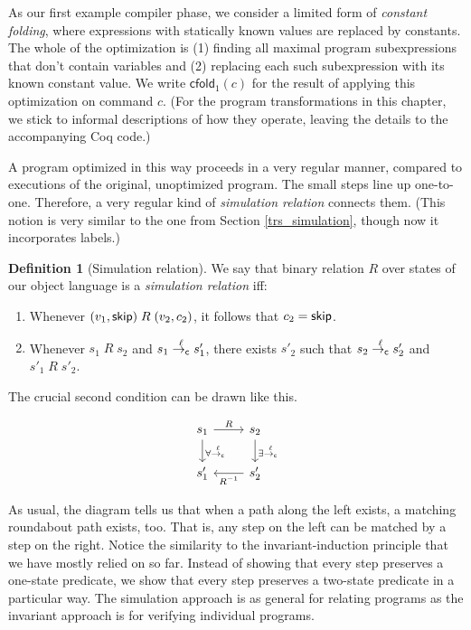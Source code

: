 \documentclass{amsbook}
\theoremstyle{definition}
\newtheorem{definition}[theorem]{Definition}
\theoremstyle{remark}
\numberwithin{section}{chapter}
\numberwithin{equation}{chapter}
\begin{document}
\newcommand{\cfold}[1]{\mathsf{cfold}_1(#1)}

As our first example compiler phase, we consider a limited form of \emph{constant folding}, where expressions with statically known values are replaced by constants.
The whole of the optimization is (1) finding all maximal program subexpressions that don't contain variables and (2) replacing each such subexpression with its known constant value.
We write $\cfold{c}$ for the result of applying this optimization on command $c$.
(For the program transformations in this chapter, we stick to informal descriptions of how they operate, leaving the details to the accompanying Coq code.)

A program optimized in this way proceeds in a very regular manner, compared to executions of the original, unoptimized program.
The small steps line up one-to-one.
Therefore, a very regular kind of \emph{simulation relation} connects them.
(This notion is very similar to the one from Section \ref{trs_simulation}, though now it incorporates labels.)

\begin{definition}[Simulation relation]
  We say that binary relation $R$ over states of our object language is a \emph{simulation relation} iff:
  \begin{enumerate}
    \item Whenever $(v_1, \mathsf{skip}) \; R \; (v_2, c_2)$, it follows that $c_2 = \mathsf{skip}$.
    \item Whenever $s_1 \; R \; s_2$ and $s_1 \stackrel{\ell}{\to_\mathsf{c}} s'_1$, there exists $s'_2$ such that $s_2 \stackrel{\ell}{\to_\mathsf{c}} s'_2$ and $s'_1 \; R \; s'_2$. 
  \end{enumerate}
\end{definition}

The crucial second condition can be drawn like this.

\[
\begin{tikzcd}
s_1 \arrow{r}{R} \arrow{d}{\forall \stackrel{\ell}{\to_{\mathsf{c}}}} & s_2 \arrow{d}{\exists \stackrel{\ell}{\to_{\mathsf{c}}}} \\
s'_1 & s'_2 \arrow{l}{R^{-1}}
\end{tikzcd}
\]

\invariants
As usual, the diagram tells us that when a path along the left exists, a matching roundabout path exists, too.
That is, any step on the left can be matched by a step on the right.
Notice the similarity to the invariant-induction principle that we have mostly relied on so far.
Instead of showing that every step preserves a one-state predicate, we show that every step preserves a two-state predicate in a particular way.
The simulation approach is as general for relating programs as the invariant approach is for verifying individual programs.
\end{document}
